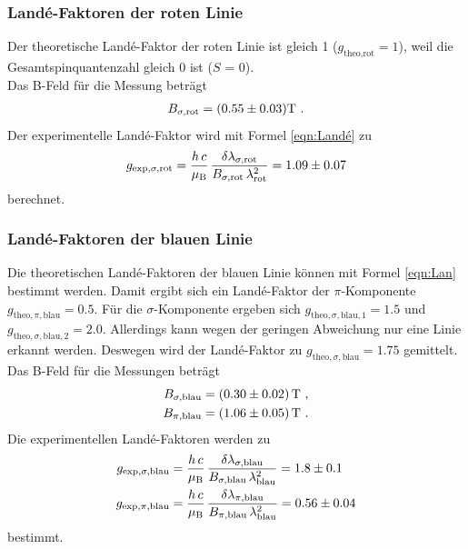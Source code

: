 \subsubsection{Landé-Faktoren der roten Linie}
Der theoretische Landé-Faktor der roten Linie ist gleich 1 ($g_\text{theo,rot} = 1$), weil die Gesamtspinquantenzahl gleich 0 ist ($S$ = 0). \\
Das B-Feld für die Messung beträgt
\begin{align*}
  B_{\sigma,\text{rot}} = (\num{0.55 +- 0.03}) \text{T} \ .
\end{align*}
Der experimentelle Landé-Faktor wird mit Formel \eqref{eqn:Landé} zu
\begin{align*}
  g_{\text{exp},\sigma,\text{rot}} = \frac{h\,c}{\mu_\text{B}}\,\frac{\delta \lambda_{\sigma,\text{rot}}}{B_{\sigma,\text{rot}}\,\lambda_\text{rot}^2} = \num{1.09 +- 0.07}
\end{align*}
berechnet.


\subsubsection{Landé-Faktoren der blauen Linie}
Die theoretischen Landé-Faktoren der blauen Linie können mit Formel \eqref{eqn:Lan} bestimmt werden. Damit ergibt sich ein Landé-Faktor der $\pi$-Komponente $g_{\text{theo},\pi,\text{blau}} = 0.5$. Für die $\sigma$-Komponente ergeben sich $g_{\text{theo},\sigma,\text{blau},1} = 1.5$ und $g_{\text{theo},\sigma,\text{blau},2} = 2.0$. Allerdings kann wegen der geringen Abweichung nur eine Linie erkannt werden. Deswegen wird der Landé-Faktor zu $g_{\text{theo},\sigma,\text{blau}} = 1.75$ gemittelt.
Das B-Feld für die Messungen beträgt
\begin{align*}
  B_{\sigma,\text{blau}} = (\num{0.3 +- 0.02})\, \text{T}\ , \\
  B_{\pi,\text{blau}} = (\num{1.06 +- 0.05})\, \text{T}\ .
\end{align*}
Die experimentellen Landé-Faktoren werden zu
\begin{align*}
  g_{\text{exp},\sigma,\text{blau}} &= \frac{h\,c}{\mu_\text{B}}\,\frac{\delta \lambda_{\sigma,\text{blau}}}{B_{\sigma,\text{blau}}\,\lambda_\text{blau}^2} = \num{1.8 +- 0.1} \\
  g_{\text{exp},\pi,\text{blau}} &= \frac{h\,c}{\mu_\text{B}}\,\frac{\delta \lambda_{\pi,\text{blau}}}{B_{\pi,\text{blau}}\,\lambda_\text{blau}^2} = \num{0.56 +- 0.04}
\end{align*}
bestimmt.





















%
